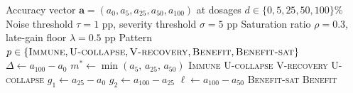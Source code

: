 
\begin{algorithm}[t]
\caption{Dose-Response Profile Classification}
\label{alg:profile-classification}
\begin{algorithmic}[1]
\REQUIRE Accuracy vector $\mathbf{a} = (a_{0}, a_{5}, a_{25}, a_{50}, a_{100})$ at dosages $d \in \{0, 5, 25, 50, 100\}\%$
\REQUIRE Noise threshold $\tau = 1$ pp, severity threshold $\sigma = 5$ pp
\REQUIRE Saturation ratio $\rho = 0.3$, late-gain floor $\lambda = 0.5$ pp
\ENSURE Pattern $p \in \{\textsc{Immune}, \textsc{U-collapse}, \textsc{V-recovery}, \textsc{Benefit}, \textsc{Benefit-sat}\}$
\STATE $\Delta \gets a_{100} - a_{0}$ 
\STATE $m^* \gets \min(a_{5},\, a_{25},\, a_{50})$ 
\IF{$|\Delta| \le \tau$}
    \RETURN \textsc{Immune} 
\ELSIF{$\Delta < -\tau$}
    \IF{$\Delta \le -\sigma$}
        \RETURN \textsc{U-collapse} 
        \RETURN \textsc{V-recovery} 
    \ELSE
        \RETURN \textsc{U-collapse} 
    \ENDIF
\ELSE \COMMENT{$\Delta > \tau$}
    \STATE $g_1 \gets a_{25} - a_{0}$ 
    \STATE $g_2 \gets a_{100} - a_{25}$ 
    \STATE $\ell \gets a_{100} - a_{50}$ 
        \RETURN \textsc{Benefit-sat} 
    \ELSE
        \RETURN \textsc{Benefit} 
    \ENDIF
\ENDIF
\end{algorithmic}
\end{algorithm}
